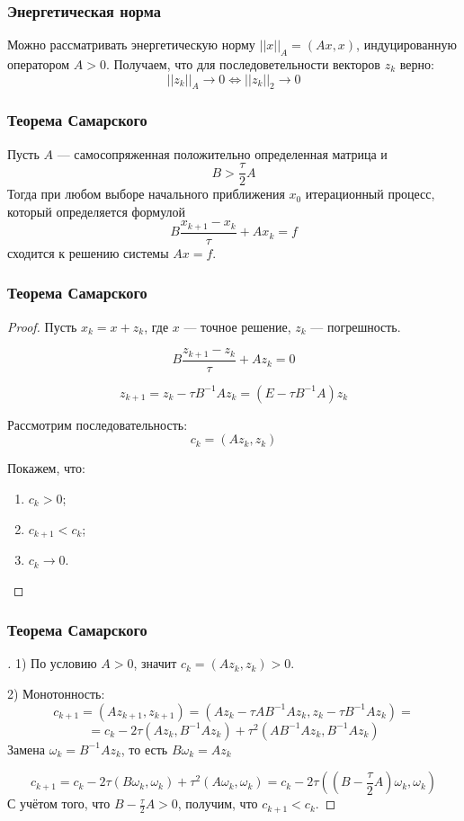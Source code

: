 \documentclass[10pt]{beamer}
\begin{document}
\begin{frame}[fragile]
\frametitle{Энергетическая норма}

\vfill
Можно рассматривать энергетическую норму $||x||_A = (Ax, x)$, индуцированную оператором $A>0$.
\vfill
Получаем, что для последоветельности векторов $z_k$ верно:
$$||z_k||_A \to 0 \Leftrightarrow ||z_k||_2 \to 0$$
\vfill
\end{frame}

\begin{frame}[fragile]
\frametitle{Теорема Самарского}

\begin{theorem}
Пусть $A$ --- самосопряженная положительно определенная матрица и
$$ B > \frac{\tau}{2} A$$
Тогда при любом выборе начального приближения $x_0$ итерационный процесс, который определяется формулой
$$ B \frac{x_{k+1} - x_k}{\tau} + A x_k = f$$
сходится к решению системы $Ax = f$.

\end{theorem}
\end{frame}


\begin{frame}[fragile]
\frametitle{Теорема Самарского}
\begin{proof}

Пусть $x_k = x + z_k$, где $x$ --- точное решение, $z_k$ --- погрешность.


$$ B \frac{z_{k+1} - z_k}{\tau} + A z_k = 0$$

$$ z_{k+1} = z_k - \tau B^{-1} A z_k = (E - \tau B^{-1} A) z_k$$

Рассмотрим последовательность:
$$ 
c_{k} = (A z_k, z_k)
$$

Покажем, что:
\begin{enumerate}
\item $c_k > 0$;
\item $c_{k+1} < c_k$;
\item $c_k \to 0$.
\end{enumerate}
\end{proof}
\end{frame}


\begin{frame}[fragile]
\frametitle{Теорема Самарского}
\begin{proof}[]
1) По условию $A > 0$, значит $c_{k} = (A z_k, z_k) > 0$.

2) Монотонность:
$$c_{k+1} = (A z_{k + 1}, z_{k+1}) = (A z_k - \tau A B^{-1} A z_k, z_k - \tau B^{-1} A z_k) =  $$
$$ = c_k - 2 \tau ( A z_k, B^{-1} A z_k) + \tau^2 (A B^{-1} A z_k, B^{-1} A z_k)$$
Замена $\omega_k = B^{-1} A z_k$, то есть $B \omega_k = A z_k$

$$ c_{k+1} = c_k - 2 \tau (B \omega_k, \omega_k) + \tau^2 (A \omega_k, \omega_k) = c_k - 2 \tau \left((B - \frac{\tau}{2} A) \omega_k, \omega_k\right)$$
С учётом того, что $B - \frac{\tau}{2} A > 0$, получим, что $c_{k+1} < c_k$.
\end{proof}
\end{frame}
\end{document}
